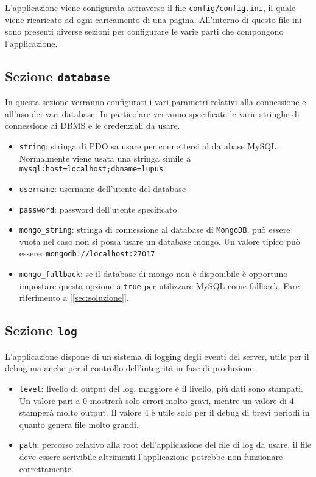 L'applicazione viene configurata attraverso il file \texttt{config/config.ini}, il quale viene ricaricato ad ogni caricamento di una pagina. All'interno di questo file ini sono presenti diverse sezioni per configurare le varie parti che compongono l'applicazione.

\subsection{Sezione \texttt{database}}
In questa sezione verranno configurati i vari parametri relativi alla connessione e all'uso dei vari database. In particolare verranno specificate le varie stringhe di connessione ai DBMS e le credenziali da usare.

\begin{itemize}[noitemsep,nolistsep]
	\item \texttt{string}: stringa di PDO sa usare per connettersi al database MySQL. Normalmente viene usata una stringa simile a \texttt{mysql:host=localhost;dbname=lupus}
	\item \texttt{username}: username dell'utente del database
	\item \texttt{password}: password dell'utente specificato
	\item \texttt{mongo\_string}: stringa di connessione al database di \texttt{MongoDB}, può essere vuota nel caso non si possa usare un database mongo. Un valore tipico può essere: \texttt{mongodb://localhost:27017}
	\item \texttt{mongo\_fallback}: se il database di mongo non è disponibile è opportuno impostare questa opzione a \texttt{true} per utilizzare MySQL come fallback. Fare riferimento a [\ref{sec:soluzione}].
\end{itemize}


\subsection{Sezione \texttt{log}}

L'applicazione dispone di un sistema di logging degli eventi del server, utile per il debug ma anche per il controllo dell'integrità in fase di produzione.

\begin{itemize}[noitemsep,nolistsep]
	\item \texttt{level}: livello di output del log, maggiore è il livello, più dati sono stampati. Un valore pari a 0 mostrerà solo errori molto gravi, mentre un valore di 4 stamperà molto output. Il valore 4 è utile solo per il debug di brevi periodi in quanto genera file molto grandi.
	\item \texttt{path}: percorso relativo alla root dell'applicazione del file di log da usare, il file deve essere scrivibile altrimenti l'applicazione potrebbe non funzionare correttamente.
\end{itemize}


